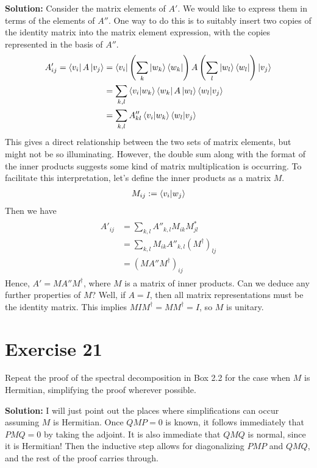 \documentclass{book}
\begin{document}
    \textbf{Solution:} Consider the matrix elements of $A'$. We would like to express them in terms of the elements of $A''$. One way to do this is to suitably insert two copies of the identity matrix into the matrix element expression, with the copies represented in the basis of $A''$. 
    \begin{align}
    \begin{aligned}
        A'_{ij} = \bra{v_i}A\ket{v_j} &= \bra{v_i}\left(\sum_k \ket{w_k}\bra{w_k}\right) A \left(\sum_l \ket{w_l}\bra{w_l}\right)\ket{v_j} \\
        &= \sum_{k,l} \bra{v_i}\ket{w_k}\bra{w_k}A\ket{w_l}\bra{w_l}\ket{v_j} \\
        &= \sum_{k,l}A''_{kl} \braket{v_i}{w_k}\braket{w_l}{v_j}
    \end{aligned}
    \end{align}
    This gives a direct relationship between the two sets of matrix elements, but might not be so illuminating. However, the double sum along with the format of the inner products suggests some kind of matrix multiplication is occurring. To facilitate this interpretation, let's define the inner products as a matrix $M$.
    \begin{align}
        M_{ij} := \bra{v_i}\ket{w_j}
    \end{align}
    Then we have
    \begin{align}
    \begin{aligned}
        A'_{ij} &= \sum_{k,l} A''_{k,l} M_{ik} M_{jl}^* \\
        &= \sum_{k,l} M_{ik} A''_{k,l} (M^\dagger)_{lj} \\
        &= (M A'' M^\dagger)_{ij}
    \end{aligned}
    \end{align}
    Hence, $A' = M A'' M^\dagger$, where $M$ is a matrix of inner products. Can we deduce any further properties of $M$? Well, if $A= I$, then all matrix representations must be the identity matrix. This implies $M I M^\dagger = M M^\dagger = I$, so $M$ is unitary. 
    
\section*{Exercise 21}
    Repeat the proof of the spectral decomposition in Box 2.2 for the case when $M$ is Hermitian, simplifying the proof wherever possible.
    
    \textbf{Solution:} I will just point out the places where simplifications can occur assuming $M$ is Hermitian. Once $QMP = 0$ is known, it follows immediately that $PMQ = 0$ by taking the adjoint. It is also immediate that $QMQ$ is normal, since it is Hermitian! Then the inductive step allows for diagonalizing $PMP$ and $QMQ$, and the rest of the proof carries through. 
    
\end{document}
